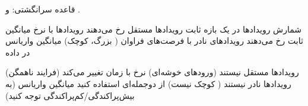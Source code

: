 قاعده سرانگشتی:  و .


\lr{\PSyes{}} شمارش رویدادها در یک بازه ثابت\PSbr{}\lr{\PSyes{}} رویدادها مستقل رخ می‌دهند\PSbr{}\lr{\PSyes{}} رویدادها با نرخ میانگین ثابت رخ می‌دهند\PSbr{}\lr{\PSyes{}} رویدادهای نادر با فرصت‌های فراوان ( بزرگ،  کوچک)\PSbr{}\lr{\PSyes{}} میانگین \lr{\ensuremath{\approx}} واریانس در داده


\PSno{} رویدادها مستقل نیستند (ورودهای خوشه‌ای)\PSbr{}\PSno{} نرخ با زمان تغییر می‌کند (فرایند ناهمگن)\PSbr{}\PSno{} رویدادها نادر نیستند ( کوچک نیست)  از دوجمله‌ای استفاده کنید\PSbr{}\PSno{} میانگین \lr{\ensuremath{\neq}} واریانس (به بیش‌پراکندگی/کم‌پراکندگی توجه کنید)



